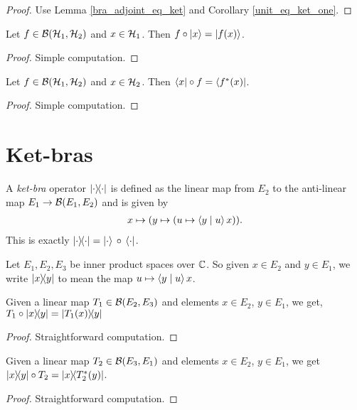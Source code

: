  \begin{proof}\leanok
  Use Lemma \ref{bra_adjoint_eq_ket} and Corollary \ref{unit_eq_ket_one}.
 \end{proof}
 \begin{lemma}\label{linearMap_comp_ket}\leanok
  Let $f\in\mathcal{B}(\mathcal{H}_1,\mathcal{H}_2)$ and $x\in\mathcal{H}_1$. Then $f\circ\left\lvert x\right\rangle=\left\lvert f(x)\right\rangle$.
 \end{lemma}
 \begin{proof}\leanok
  Simple computation.
 \end{proof}
 \begin{lemma}\label{bra_comp_linearMap}\leanok
  Let $f\in\mathcal{B}(\mathcal{H}_1,\mathcal{H}_2)$ and $x\in\mathcal{H}_2$. Then $\left\langle x\right\rvert\circ f=\left\langle f^*(x)\right\rvert$.
 \end{lemma}
 \begin{proof}\leanok
  Simple computation.
 \end{proof}

\section{Ket-bras}
\begin{definition}\label{rankOne}\leanok
  A \textit{ket-bra} operator $\left\lvert\cdot\right\rangle\!\!\left\langle\cdot\right\rvert$ is defined as the linear map from $E_2$ to the anti-linear map $E_1\to\mathcal{B}(E_1,E_2)$ and is given by
  \begin{align*}
    x\mapsto(y\mapsto(u\mapsto\left\langle y \mid u\right\rangle x)).
  \end{align*}
  This is exactly $\left\lvert\cdot\right\rangle\!\!\left\langle\cdot\right\rvert=\left\lvert\cdot\right\rangle\,\circ\,\left\langle\cdot\right\rvert$.
\end{definition}
Let $E_1,E_2,E_3$ be inner product spaces over $\mathbb{C}$.
So given $x\in{E_2}$ and $y\in{E_1}$, we write $\left\lvert x\right\rangle\!\!\left\langle y\right\rvert$ to mean the map $u\mapsto\left\langle y \mid u\right\rangle x$.

 \begin{lemma}\label{linearMap_comp_rankOne}\leanok
  Given a linear map $T_1\in\mathcal{B}(E_2,E_3)$ and elements $x\in E_2$, $y\in{E_1}$, we get, $T_1\circ\left\lvert x\right\rangle\!\!\left\langle y\right\rvert=\left\lvert T_1(x)\right\rangle\!\!\left\langle y\right\rvert$
 \end{lemma}
 \begin{proof}\leanok
  Straightforward computation.
 \end{proof}
 
 \begin{lemma}\label{rankOne_comp_linearMap}\leanok
  Given a linear map $T_2\in\mathcal{B}(E_3,E_1)$ and elements $x\in E_2$, $y\in E_1$, we get $\left\lvert x\right\rangle\!\!\left\langle y\right\rvert\circ T_2=\left\lvert x\right\rangle\!\!\left\langle T_2^*(y)\right\rvert$.
 \end{lemma}
 \begin{proof}\leanok
  Straightforward computation.
 \end{proof}
 

